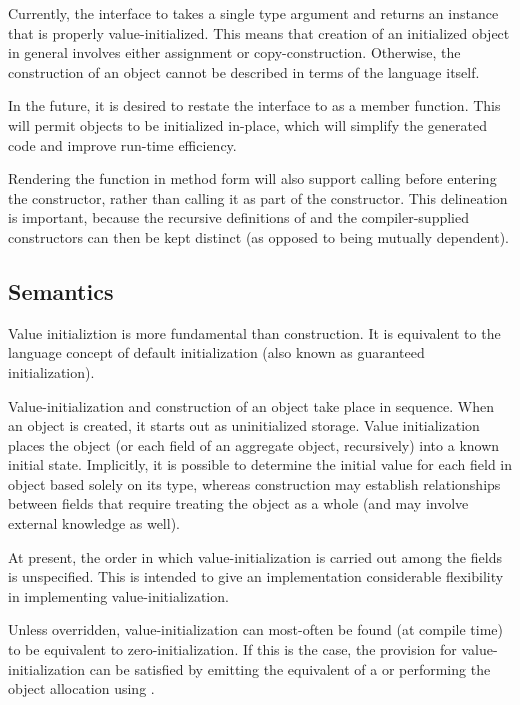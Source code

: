 \begin{future}

Currently, the interface to  takes a single type argument and
returns an instance that is properly value-initialized.  This means that
creation of an initialized object in general involves either assignment or
copy-construction.  Otherwise, the construction of an object cannot be described
in terms of the language itself.

In the future, it is desired to restate the interface to  as
a member function.  This will permit objects to be initialized in-place, which
will simplify the generated code and improve run-time efficiency.

Rendering the  function in method form will also support
calling  before entering the constructor, rather than calling
it as part of the constructor.  This delineation is important, because the
recursive definitions of  and the compiler-supplied
constructors can then be kept distinct (as opposed to being mutually dependent).

\end{future}

\subsection{Semantics}

Value initializtion is more fundamental than construction.  It is equivalent to
the language concept of default initialization (also known as guaranteed
initialization).  

Value-initialization and construction of an object take place in sequence.  When
an object is created, it starts out as uninitialized storage.  Value
initialization places the object (or each field of an aggregate object,
recursively) into a known initial state.  Implicitly, it is possible to
determine the initial value for each field in object based solely on its type, whereas
construction may establish relationships between fields that require treating
the object as a whole (and may involve external knowledge as well).

\begin{note}
At present, the order in which value-initialization is carried out among the
fields is unspecified.  This is intended to give an implementation considerable
flexibility in implementing value-initialization.

Unless overridden, value-initialization can most-often be found (at compile
time) to be equivalent to zero-initialization.  If this is the case, the
provision for value-initialization can be satisfied by emitting the equivalent
of a  or performing the object allocation
using .
\end{note}


